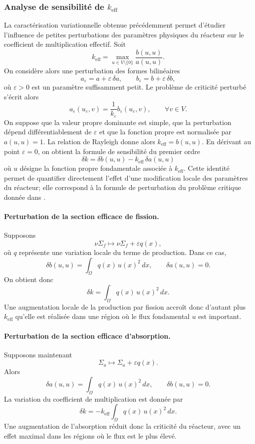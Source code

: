 \documentclass{article}
\newcommand{\keff}{k_{\mathrm{eff}}}
\begin{document}
\subsubsection{Analyse de sensibilité de $\keff$}
La caractérisation variationnelle obtenue précédemment permet d'étudier l'influence de petites perturbations des paramètres physiques du réacteur sur le coefficient de multiplication effectif. Soit 
\[
\keff = \max_{u\in V\setminus\{0\}} \frac{b(u,u)}{a(u,u)}.
\] 
On considère alors une perturbation des formes bilinéaires 
\[ 
a_\varepsilon=a+\varepsilon \,\delta a, \qquad b_\varepsilon=b+\varepsilon \,\delta b, 
\] 
où $\varepsilon>0$ est un paramètre suffisamment petit. Le problème de criticité perturbé s'écrit alors \[ a_\varepsilon(u_\varepsilon,v) = \frac{1}{k_\varepsilon} b_\varepsilon(u_\varepsilon,v), 
\qquad \forall v\in V. \] 
On suppose que la valeur propre dominante est simple, que la perturbation dépend différentiablement de $\varepsilon$ et que la fonction propre est normalisée par $a(u,u)=1$. La relation de Rayleigh donne alors $k_{\mathrm{eff}}=b(u,u)$. En dérivant au point $\varepsilon=0$, on obtient la formule de sensibilité du premier ordre
\[  \delta k = \delta b(u,u) - \keff\,\delta a(u,u)  \] 
où $u$ désigne la fonction propre fondamentale associée à $\keff$. Cette identité permet de quantifier directement l'effet d'une modification locale des paramètres du réacteur; elle correspond à la formule de perturbation du problème critique donnée dans \cite[chap.~6, section~6.6.2]{Allaire2018}.

\paragraph{Perturbation de la section efficace de fission.} Supposons 
\[ \nu\Sigma_f \longmapsto \nu\Sigma_f+\varepsilon q(x), \] 
où $q$ représente une variation locale du terme de production. Dans ce cas, 
\[ \delta b(u,u) = \int_\Omega q(x)\,u(x)^2\,dx, \qquad \delta a(u,u)=0. \] 
On obtient donc 
\[ \delta k = \int_\Omega q(x)\,u(x)^2\,dx.\] 
Une augmentation locale de la production par fission accroît donc d'autant plus $\keff$ qu'elle est réalisée dans une région où le flux fondamental $u$ est important. 

\paragraph{Perturbation de la section efficace d'absorption.} Supposons maintenant 
\[ \Sigma_a \longmapsto \Sigma_a+\varepsilon q(x). \] 
Alors 
\[ \delta a(u,u) = \int_\Omega q(x)\,u(x)^2\,dx, \qquad \delta b(u,u)=0. \] 
La variation du coefficient de multiplication est donnée par 
\[ \delta k = -k_{\mathrm{eff}} \int_\Omega q(x)\,u(x)^2\,dx.\] 
Une augmentation de l'absorption réduit donc la criticité du réacteur, avec un effet maximal dans les régions où le flux est le plus élevé. 
\end{document}
